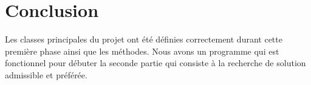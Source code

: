 \documentclass[12pt]{article}
\theoremstyle{definition}
\begin{document}
	
	\section{Conclusion}
	Les classes principales du projet ont été définies correctement durant cette première phase ainsi que les méthodes. Nous avons un programme qui est fonctionnel pour débuter la seconde partie qui
	consiste à la recherche de solution admissible et préférée.
	
		
		
	\bigskip
	
\end{document}
